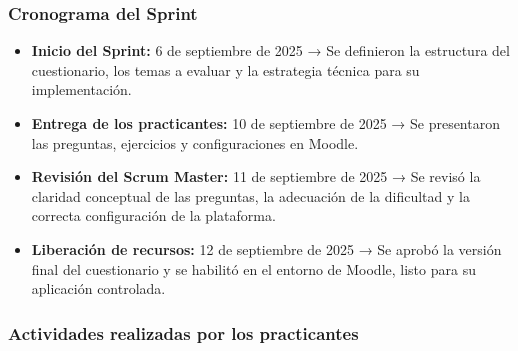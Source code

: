 \documentclass[letter,oneside,12pt,spanish]{report}
\begin{document}
\subsubsection*{Cronograma del Sprint}
\begin{itemize}
	\item \textbf{Inicio del Sprint:} 6 de septiembre de 2025 → Se definieron la estructura del cuestionario, los temas a evaluar y la estrategia técnica para su implementación.
	\item \textbf{Entrega de los practicantes:} 10 de septiembre de 2025 → Se presentaron las preguntas, ejercicios y configuraciones en Moodle.
	\item \textbf{Revisión del Scrum Master:} 11 de septiembre de 2025 → Se revisó la claridad conceptual de las preguntas, la adecuación de la dificultad y la correcta configuración de la plataforma.
	\item \textbf{Liberación de recursos:} 12 de septiembre de 2025 → Se aprobó la versión final del cuestionario y se habilitó en el entorno de Moodle, listo para su aplicación controlada.
\end{itemize}

\subsubsection*{Actividades realizadas por los practicantes}
\end{document}
